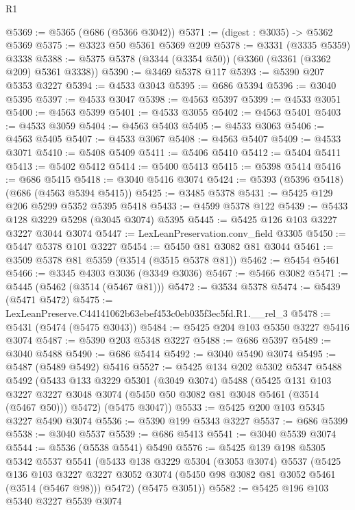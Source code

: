 \begin{lexlean}{R1}
\begin{coremodule}
@5369 := @5365 (@686 (@5366 @3042))
@5371 := (digest : @3035) -> @5362 @5369
@5375 := @3323 @50 @5361 @5369 @209
@5378 := @3331 (@3335 @5359) @3338
@5388 := @5375 @5378 (@3344 (@3354 @50)) (@3360 (@3361 (@3362 @209) @5361 @3338))
@5390 := @3469 @5378 @117
@5393 := @5390 @207 @5353 @3227
@5394 := @4533 @3043
@5395 := @686 @5394
@5396 := @3040 @5395
@5397 := @4533 @3047
@5398 := @4563 @5397
@5399 := @4533 @3051
@5400 := @4563 @5399
@5401 := @4533 @3055
@5402 := @4563 @5401
@5403 := @4533 @3059
@5404 := @4563 @5403
@5405 := @4533 @3063
@5406 := @4563 @5405
@5407 := @4533 @3067
@5408 := @4563 @5407
@5409 := @4533 @3071
@5410 := @5408 @5409
@5411 := @5406 @5410
@5412 := @5404 @5411
@5413 := @5402 @5412
@5414 := @5400 @5413
@5415 := @5398 @5414
@5416 := @686 @5415
@5418 := @3040 @5416 @3074
@5424 := @5393 (@5396 @5418) (@686 (@4563 @5394 @5415))
@5425 := @3485 @5378
@5431 := @5425 @129 @206 @5299 @5352 @5395 @5418
@5433 := @4599 @5378 @122
@5439 := @5433 @128 @3229 @5298 (@3045 @3074) @5395
@5445 := @5425 @126 @103 @3227 @3227 @3044 @3074
@5447 := LexLeanPreservation.conv_field @3305
@5450 := @5447 @5378 @101 @3227
@5454 := @5450 @81 @3082 @81 @3044
@5461 := @3509 @5378 @81 @5359 (@3514 (@3515 @5378 @81))
@5462 := @5454 @5461
@5466 := @3345 @4303 @3036 (@3349 @3036)
@5467 := @5466 @3082
@5471 := @5445 (@5462 (@3514 (@5467 @81)))
@5472 := @3534 @5378
@5474 := @5439 (@5471 @5472)
@5475 := LexLeanPreserve.C44141062b63ebef453c0eb035f3ec5fd.R1.__rel_3
@5478 := @5431 (@5474 (@5475 @3043))
@5484 := @5425 @204 @103 @5350 @3227 @5416 @3074
@5487 := @5390 @203 @5348 @3227
@5488 := @686 @5397
@5489 := @3040 @5488
@5490 := @686 @5414
@5492 := @3040 @5490 @3074
@5495 := @5487 (@5489 @5492) @5416
@5527 := @5425
    @134
    @202
    @5302
    @5347
    @5488
    @5492
    (@5433
      @133
      @3229
      @5301
      (@3049 @3074)
      @5488
      (@5425
        @131
        @103
        @3227
        @3227
        @3048
        @3074
        (@5450 @50 @3082 @81 @3048 @5461 (@3514 (@5467 @50)))
        @5472)
      (@5475 @3047))
@5533 := @5425 @200 @103 @5345 @3227 @5490 @3074
@5536 := @5390 @199 @5343 @3227
@5537 := @686 @5399
@5538 := @3040 @5537
@5539 := @686 @5413
@5541 := @3040 @5539 @3074
@5544 := @5536 (@5538 @5541) @5490
@5576 := @5425
    @139
    @198
    @5305
    @5342
    @5537
    @5541
    (@5433
      @138
      @3229
      @5304
      (@3053 @3074)
      @5537
      (@5425
        @136
        @103
        @3227
        @3227
        @3052
        @3074
        (@5450 @98 @3082 @81 @3052 @5461 (@3514 (@5467 @98)))
        @5472)
      (@5475 @3051))
@5582 := @5425 @196 @103 @5340 @3227 @5539 @3074

\end{coremodule}
\end{lexlean}

